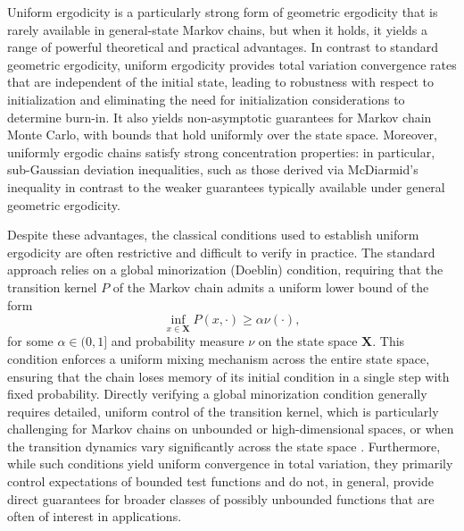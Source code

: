 \documentclass[ejsv2, noshowframe]{imsart}
\theoremstyle{plain}
\theoremstyle{definition}
\theoremstyle{remark}
\newcommand{\X}{\textbf{X}}
\begin{document}


Uniform ergodicity is a particularly strong form of geometric ergodicity that is rarely available in general-state Markov chains, but when it holds, it yields a range of powerful theoretical and practical advantages. In contrast to standard geometric ergodicity, uniform ergodicity provides total variation convergence rates that are independent of the initial state, leading to robustness with respect to initialization and eliminating the need for initialization considerations to determine burn-in. It also yields non-asymptotic guarantees for Markov chain Monte Carlo, with bounds that hold uniformly over the state space. Moreover, uniformly ergodic chains satisfy strong concentration properties: in particular, sub-Gaussian deviation inequalities, such as those derived via McDiarmid's inequality \citep{mcdiarmid:1989, marton:2003} in contrast to the weaker guarantees typically available under general geometric ergodicity.

Despite these advantages, the classical conditions used to establish uniform ergodicity are often restrictive and difficult to verify in practice. The standard approach relies on a global minorization (Doeblin) condition, requiring that the transition kernel $P$ of the Markov chain admits a uniform lower bound of the form 
\[
\inf_{x \in \X} P(x,\cdot) \ge \alpha \nu(\cdot),
\]
for some $\alpha \in (0, 1]$ and probability measure $\nu$ on the state space $\X$. This condition enforces a uniform mixing mechanism across the entire state space, ensuring that the chain loses memory of its initial condition in a single step with fixed probability. Directly verifying a global minorization condition generally requires detailed, uniform control of the transition kernel, which is particularly challenging for Markov chains on unbounded or high-dimensional spaces, or when the transition dynamics vary significantly across the state space \citep{mengersen:tweedie:1996, ChoiHobert2013}. Furthermore, while such conditions yield uniform convergence in total variation, they primarily control expectations of bounded test functions and do not, in general, provide direct guarantees for broader classes of possibly unbounded functions that are often of interest in applications. 
\end{document}
